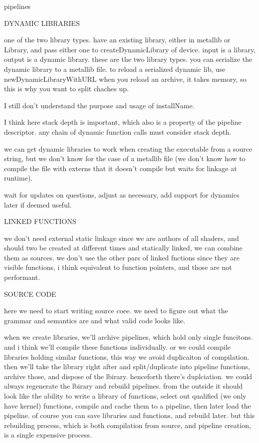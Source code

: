 pipelines

DYNAMIC LIBRARIES

one of the two library types.
have an existing library, either in metallib or Library, and pass either one to createDynamicLibrary of device. input is a library, output is a dynamic library. these are the two library types. 
you can serialize the dynamic library to a metallib file.
to reload a serialized dynamic lib, use newDynamicLibraryWithURL
when you reload an archive, it takes memory, so this is why you want to split chaches up. 

I still don't understand the purpose and usage of installName.

I think here stack depth is important, which also is a property of the pipeline descriptor.
any chain of dynamic function calls must consider stack depth.

we can get dynamic libraries to work when creating the executable from a source string, but we don't know for the case of a metallib file (we don't know how to compile the file with externs that it doesn't compile but waits for linkage at runtime).

wait for updates on questions, adjust as necessary, add support for dynamics later if deemed useful.


LINKED FUNCTIONS

we don't need external static linkage since we are authors of all shaders, and should two be created at different times and statically linked, we can combine them as sources.
we don't use the other pars of linked fnctions since they are visible functions, i think equivalent to function pointers, and those are not performant. 


SOURCE CODE

here we need to start writing source coee. we need to figure out what the grammar and semantics are and what valid code looks like. 

when we create libraries, 
we'll archive pipelines, which hold only single funcitons. and i think we'll compile these functions individually. or we could compile libraries holding similar functions, this way we avoid duplicaiton of compilation. then we'll take the library right after and split/duplicate into pipeline functions, archive those, and dispose of the lbirary. henceforth there's duplciation. we could always regenerate the lbirary and rebuild pipelines.
from the outside it should look like the ability to write a library of functions, select out qualified (we only have kernel) functions, compile and cache them to a pipeline, then later load the pipeline. of course you can save libraries and functions, and rebuild later. but this rebuilding process, which is both compilation from source, and pipeline creation, is a single expensive process. 


